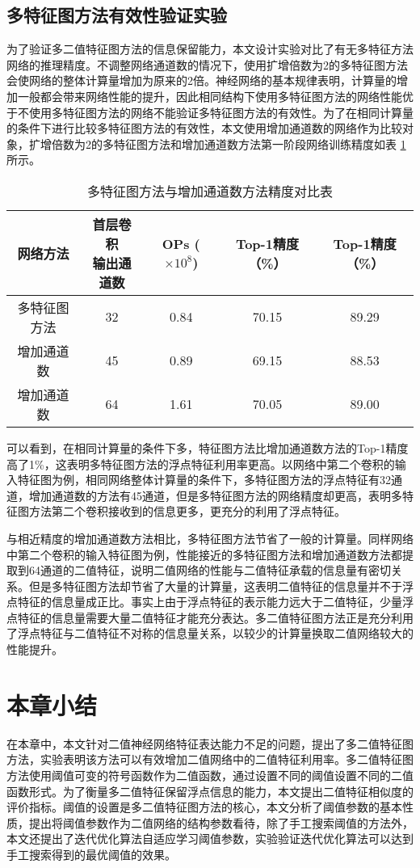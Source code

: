\subsection{多特征图方法有效性验证实验}

为了验证多二值特征图方法的信息保留能力，本文设计实验对比了有无多特征方法网络的推理精度。不调整网络通道数的情况下，使用扩增倍数为2的多特征图方法会使网络的整体计算量增加为原来的2倍。神经网络的基本规律表明，计算量的增加一般都会带来网络性能的提升，因此相同结构下使用多特征图方法的网络性能优于不使用多特征图方法的网络不能验证多特征图方法的有效性。为了在相同计算量的条件下进行比较多特征图方法的有效性，本文使用增加通道数的网络作为比较对象，扩增倍数为2的多特征图方法和增加通道数方法第一阶段网络训练精度如表 \ref{tab:6} 所示。

\begin{table}[htb]
  \vspace{6pt}
  \centering
  \caption{多特征图方法与增加通道数方法精度对比表}
  \label{tab:6}
  \begin{tabular}{ccccc}
    \toprule
    网络方法   & \makecell{首层卷积\\输出通道数} & OPs ($\times 10^8$) & Top-1精度（\%）& Top-1精度（\%） \\
    \midrule
    多特征图方法 & 32 & 0.84 & 70.15 & 89.29 \\
    增加通道数   & 45 & 0.89 & 69.15 & 88.53 \\
    增加通道数   & 64 & 1.61 & 70.05 & 89.00 \\
    \bottomrule
  \end{tabular}
  \vspace{6pt}
\end{table}

可以看到，在相同计算量的条件下多，特征图方法比增加通道数方法的Top-1精度高了1\%，这表明多特征图方法的浮点特征利用率更高。以网络中第二个卷积的输入特征图为例，相同网络整体计算量的条件下，多特征图方法的浮点特征有32通道，增加通道数的方法有45通道，但是多特征图方法的网络精度却更高，表明多特征图方法第二个卷积接收到的信息更多，更充分的利用了浮点特征。

与相近精度的增加通道数方法相比，多特征图方法节省了一般的计算量。同样网络中第二个卷积的输入特征图为例，性能接近的多特征图方法和增加通道数方法都提取到64通道的二值特征，说明二值网络的性能与二值特征承载的信息量有密切关系。但是多特征图方法却节省了大量的计算量，这表明二值特征的信息量并不于浮点特征的信息量成正比。事实上由于浮点特征的表示能力远大于二值特征，少量浮点特征的信息量需要大量二值特征才能充分表达。多二值特征图方法正是充分利用了浮点特征与二值特征不对称的信息量关系，以较少的计算量换取二值网络较大的性能提升。

\section{本章小结}

在本章中，本文针对二值神经网络特征表达能力不足的问题，提出了多二值特征图方法，实验表明该方法可以有效增加二值网络中的二值特征利用率。多二值特征图方法使用阈值可变的符号函数作为二值函数，通过设置不同的阈值设置不同的二值函数形式。为了衡量多二值特征保留浮点信息的能力，本文提出二值特征相似度的评价指标。阈值的设置是多二值特征图方法的核心，本文分析了阈值参数的基本性质，提出将阈值参数作为二值网络的结构参数看待，除了手工搜索阈值的方法外，本文还提出了迭代优化算法自适应学习阈值参数，实验验证迭代优化算法可以达到手工搜索得到的最优阈值的效果。
